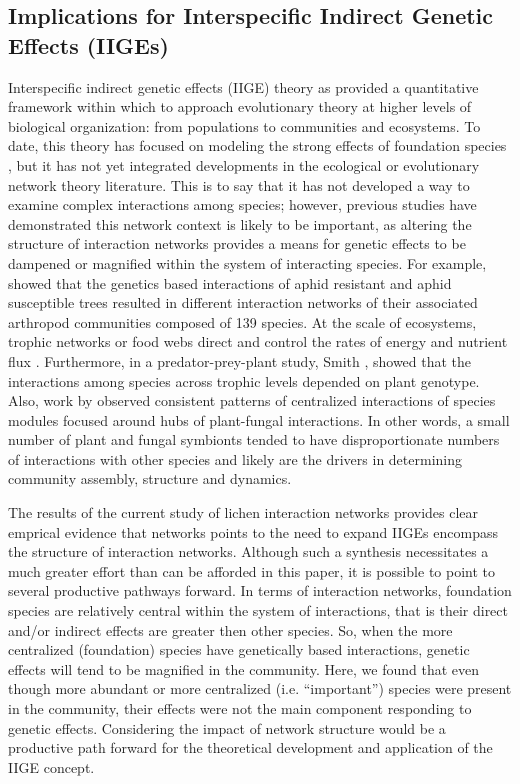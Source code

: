 \documentclass[11pt,twocolumn,twoside,lineno]{pnas-new}
\begin{document}
\subsection*{Implications for Interspecific Indirect Genetic Effects (IIGEs)}

Interspecific indirect genetic effects (IIGE) theory as provided a
quantitative framework within which to approach evolutionary theory at
higher levels of biological organization: from populations to
communities and ecosystems. To date, this theory has focused on
modeling the strong effects of foundation species
\cite{Shuster2006COMMUNITYSTRUCTURE, Whitham2012}, but it has not yet
integrated developments in the ecological or evolutionary network
theory literature. This is to say that it has not developed a way to
examine complex interactions among species; however, previous studies
have demonstrated this network context is likely to be important, as
altering the structure of interaction networks provides a means for
genetic effects to be dampened or magnified within the system of
interacting species. For example, \citep{Keith2017} showed that the
genetics based interactions of aphid resistant and aphid susceptible
trees resulted in different interaction networks of their associated
arthropod communities composed of 139 species. At the scale of
ecosystems, trophic networks or food webs direct and control the rates
of energy and nutrient flux \cite{Borgatti2006}. Furthermore, in a
predator-prey-plant study, Smith \cite{Smith2011}, showed that the
interactions among species across trophic levels depended on plant
genotype. Also, work by \citep{Toju2017, Toju2016, Toju2014a} observed
consistent patterns of centralized interactions of species modules
focused around hubs of plant-fungal interactions. In other words, a
small number of plant and fungal symbionts tended to have
disproportionate numbers of interactions with other species and likely
are the drivers in determining community assembly, structure and
dynamics. 

The results of the current study of lichen interaction networks
provides clear emprical evidence that networks points to the need to
expand IIGEs encompass the structure of interaction networks. Although
such a synthesis necessitates a much greater effort than can be
afforded in this paper, it is possible to point to several productive
pathways forward. In terms of interaction networks, foundation species
are relatively central within the system of interactions, that is
their direct and/or indirect effects are greater then other
species. So, when the more centralized (foundation) species have
genetically based interactions, genetic effects will tend to be
magnified in the community. Here, we found that even though more
abundant or more centralized (i.e. ``important'') species were present
in the community, their effects were not the main component responding
to genetic effects. Considering the impact of network structure would
be a productive path forward for the theoretical development and
application of the IIGE concept. 
\end{document}
